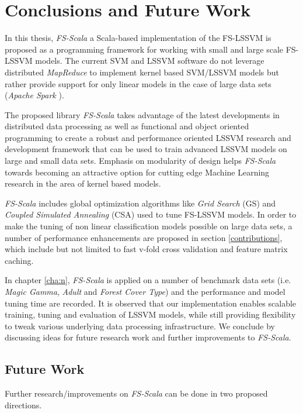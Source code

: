 \chapter{Conclusions and Future Work}\label{cha:conclusion}

In this thesis, \emph{FS-Scala} a Scala-based implementation of the FS-LSSVM is proposed as a programming framework for working with small and large scale FS-LSSVM models. The current SVM and LSSVM software do not leverage distributed \emph{MapReduce} to implement kernel based SVM/LSSVM models but rather provide support for only linear models in the case of large data sets (\emph{Apache Spark} \cite{Spark:2010}). 

The proposed library  \emph{FS-Scala} takes advantage of the latest developments in distributed data processing as well as functional and object oriented programming to create a robust and performance oriented LSSVM research and development framework that can be used to train advanced LSSVM models on large and small data sets. Emphasis on modularity of design helps \emph{FS-Scala} towards becoming an attractive option for cutting edge Machine Learning research in the area of kernel based models.

\emph{FS-Scala} includes global optimization algorithms like \emph{Grid Search} (GS) and \emph{Coupled Simulated Annealing} (CSA) used to tune FS-LSSVM models. In order to make the tuning of non linear classification models possible on large data sets, a number of performance enhancements are proposed in section \ref{contributions}, which include but not limited to fast v-fold cross validation and feature matrix caching.

In chapter \ref{cha:n}, \emph{FS-Scala} is applied on a number of benchmark data sets (i.e. \emph{Magic Gamma}, \emph{Adult} and \emph{Forest Cover Type}) and the performance and model tuning time are recorded. It is observed that our implementation enables scalable training, tuning and evaluation of LSSVM models, while still providing flexibility to tweak various underlying data processing infrastructure. We conclude by discussing ideas for future research work and further improvements to \emph{FS-Scala}. 

\section*{Future Work}

Further research/improvements on \emph{FS-Scala} can be done in two proposed directions.

